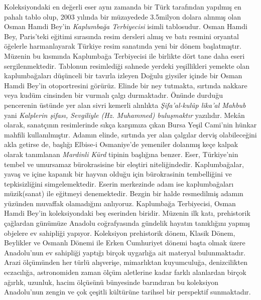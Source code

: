 \indent Koleksiyondaki en değerli eser aynı zamanda bir Türk tarafından yapılmış en pahalı tablo olup, 2003 yılında bir müzayedede 3.5milyon dolara alınmış olan Osman Hamdi Bey'in \textit{Kaplumbağa Terbiyecisi} isimli tablosudur. Osman Hamdi Bey, Paris'teki eğitimi sırasında resim dersleri almış ve batı resmini oryantal öğelerle harmanlayarak Türkiye resim sanatında yeni bir dönem başlatmıştır. Müzenin bu kısmında Kaplumbağa Terbiyecisi ile birlikte dört tane daha eseri sergilenmektedir.\newline
\indent Tablonun resimlediği sahnede yerdeki yeşillikleri yemekte olan kaplumbağaları düşünceli bir tavırla izleyen Doğulu giysiler içinde bir Osman Hamdi Bey'in otoportresini görürüz.  Elinde bir ney tutmakta, sırtında nakkare veya kudüm cinsinden bir vurmalı çalgı durmaktadır. Önünde durduğu pencerenin üstünde yer alan sivri kemerli alınlıkta \textit{Şifa’al-kulûp lika’al Mahbub} yani \textit{Kalplerin şifası, Sevgiliyle (Hz. Muhammed) buluşmaktır} yazılıdır. Mekân olarak, sanatçının resimlerinde sıkça karşımıza çıkan Bursa Yeşil Cami’nin hünkar mahfili kullanılmıştır. Adamın elinde, sırtında yer alan çalgılar derviş olabileceğini akla getirse de, başlığı Elbise-i Osmaniye’de yemeniler dolanmış keçe kalpak olarak tanımlanan \textit{Mardinli Kürd} tipinin başlığına benzer. Eser, Türkiye'nin tembel ve umursamaz bürokrasisine bir eleştiri niteliğindedir. Kaplumbağalar, yavaş ve içine kapanık bir hayvan olduğu için bürokrasinin tembelliğini ve tepkisizliğini simgelemektedir. Eserin merkezinde adam ise kaplumbağaları müzik(sanat) ile eğitmeyi denemektedir. Bezgin bir halde resmedilmiş adamın yüzünden muvaffak olamadığını anlıyoruz. Kaplumbağa Terbiyecisi, Osman Hamdi Bey’in koleksiyondaki beş eserinden biridir.\newline
\indent Müzenin ilk katı, prehistorik çağlardan günümüze Anadolu coğrafyasında gündelik hayatın tanıklığını yapmış objelere ev sahipliği yapıyor. Koleksiyon prehistorik dönem, Klasik Dönem, Beylikler ve Osmanlı Dönemi ile Erken Cumhuriyet dönemi başta olmak üzere Anadolu’nun ev sahipliği yaptığı birçok uygarlığa ait materyal bulunmaktadır. Arazi ölçümünden her türlü alışverişe, mimarlıktan kuyumculuğa, denizcilikten eczacılığa, astronomiden zaman ölçüm aletlerine kadar farklı alanlardan birçok ağırlık, uzunluk, hacim ölçüsünü bünyesinde barındıran bu koleksiyon Anadolu’nun zengin ve çok çeşitli kültürüne tarihsel bir perspektif sunmaktadır.
